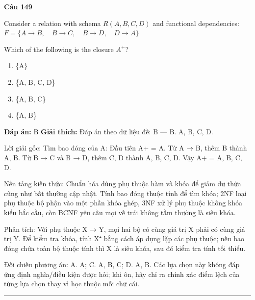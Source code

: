 \documentclass[11pt,a4paper]{article}
\newenvironment{question}[1]{%
  \par\vspace{1em}\noindent\textbf{\large Câu #1}\par\vspace{0.4em}
}{%
  \par\vspace{1em}\hrule\vspace{0.6em}
}
\newenvironment{choices}{%
  \begin{enumerate}[label=\textbf{\Alph*.},leftmargin=2.2em,itemsep=2pt,topsep=3pt]
}{%
  \end{enumerate}
}
\newcommand{\choice}{\item}
\begin{document}
\begin{question}{149}
Consider a relation with schema \(R(A, B, C, D)\) and functional dependencies:
\(F = \{ A \rightarrow B, \quad B \rightarrow C, \quad B \rightarrow D, \quad D \rightarrow A \}\)

Which of the following is the closure \(A^+\)?
\begin{choices}
\choice \{A\}
\choice \{A, B, C, D\}
\choice \{A, B, C\}
\choice \{A, B\}
\end{choices}
\textbf{Đáp án:} B
\textbf{Giải thích:} Đáp án theo dữ liệu đề: B — B. {A, B, C, D}.

Lời giải gốc: Tìm bao đóng của A: Đầu tiên {A}+ = {A}. Từ A → B, thêm B thành {A, B}. Từ B → C và B → D, thêm C, D thành {A, B, C, D}. Vậy {A}+ = {A, B, C, D}.

Nền tảng kiến thức: Chuẩn hóa dùng phụ thuộc hàm và khóa để giảm dư thừa cũng như bất thường cập nhật. Tính bao đóng thuộc tính để tìm khóa; 2NF loại phụ thuộc bộ phận vào một phần khóa ghép, 3NF xử lý phụ thuộc không khóa kiểu bắc cầu, còn BCNF yêu cầu mọi vế trái không tầm thường là siêu khóa.

Phân tích: Với phụ thuộc X → Y, mọi hai bộ có cùng giá trị X phải có cùng giá trị Y. Để kiểm tra khóa, tính X⁺ bằng cách áp dụng lặp các phụ thuộc; nếu bao đóng chứa toàn bộ thuộc tính thì X là siêu khóa, sau đó kiểm tra tính tối thiểu.

Đối chiếu phương án: A. {A}; C. {A, B, C}; D. {A, B}. Các lựa chọn này không đáp ứng định nghĩa/điều kiện được hỏi; khi ôn, hãy chỉ ra chính xác điểm lệch của từng lựa chọn thay vì học thuộc mỗi chữ cái.
\end{question}
\end{document}
